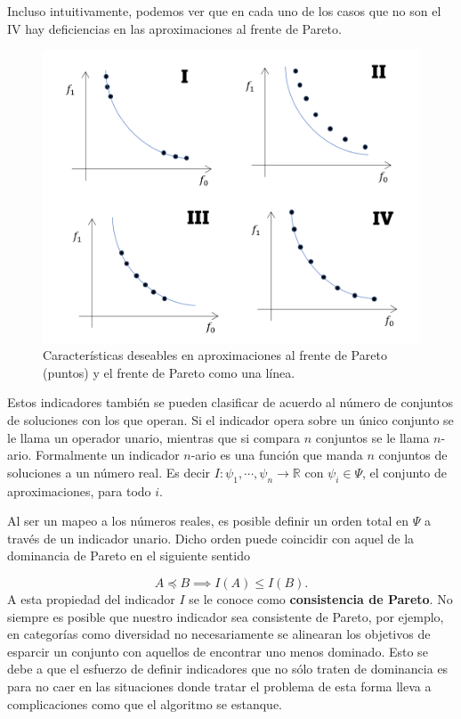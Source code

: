 Incluso intuitivamente, podemos ver que en cada uno de los casos que no son el IV hay deficiencias en las aproximaciones al frente de Pareto. 

\begin{figure}[H]
    \centering
    \includegraphics[scale=0.5]{Figuras/carac_deseables_Pareto.png}
    \caption[Características deseables en aproximación al PF]{Características deseables en aproximaciones al frente de Pareto (puntos) y el frente de Pareto como una línea.}
    \label{fig:carac_deseables_aprox}
\end{figure}

Estos indicadores también se pueden clasificar de acuerdo al número de conjuntos de soluciones con los que operan. Si el indicador opera sobre un único conjunto  se le llama un operador unario, mientras que si compara $n$ conjuntos se le llama $n$-ario. Formalmente un indicador $n$-ario \cite{PFI} es  una función que manda  $n$ conjuntos de soluciones a un número real. Es decir $I:\psi_1,\cdots,\psi_n \rightarrow \mathbb{R}$ con $\psi_i \in  \Psi$, el conjunto de aproximaciones, para todo $i$. 


Al ser un mapeo a los números reales, es posible definir un orden total en $\Psi$ a través de un indicador unario. Dicho orden puede coincidir con aquel de la dominancia de Pareto en el siguiente sentido

\begin{equation} \label{eq:consistente_Pareto}
    A \preceq B \implies I(A)\leq I(B).
\end{equation}
A esta propiedad del indicador $I$ se le conoce como \textbf{consistencia de Pareto}. No siempre es posible que nuestro indicador sea consistente de Pareto, por ejemplo, en categorías como diversidad no necesariamente se alinearan los objetivos de esparcir un conjunto con aquellos de encontrar uno menos dominado. Esto se debe a que el esfuerzo de definir indicadores que no sólo traten de dominancia es para no caer en las situaciones donde tratar el problema de esta forma lleva a complicaciones como que el algoritmo se estanque.

